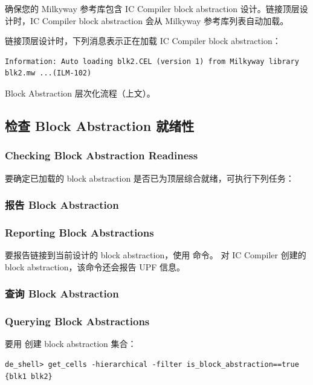 确保您的 Milkyway 参考库包含 IC Compiler block abstraction 设计。链接顶层设计时，IC Compiler block abstraction 会从 Milkyway 参考库列表自动加载。

链接顶层设计时，下列消息表示正在加载 IC Compiler block abstraction：
\begin{lstlisting}
Information: Auto loading blk2.CEL (version 1) from Milkyway library
blk2.mw ...(ILM-102)
\end{lstlisting}

\begin{seeAlsoBox}
Block Abstraction 层次化流程（上文）。
\end{seeAlsoBox}

\subsection{检查 Block Abstraction 就绪性}
\subsubsection*{Checking Block Abstraction Readiness}

要确定已加载的 block abstraction 是否已为顶层综合就绪，可执行下列任务：

\subsubsection{报告 Block Abstraction}
\subsubsection*{Reporting Block Abstractions}

要报告链接到当前设计的 block abstraction，使用  命令。
对 IC Compiler 创建的 block abstraction，该命令还会报告 UPF 信息。

\subsubsection{查询 Block Abstraction}
\subsubsection*{Querying Block Abstractions}

要用  创建 block abstraction 集合：
\begin{lstlisting}
de_shell> get_cells -hierarchical -filter is_block_abstraction==true
{blk1 blk2}
\end{lstlisting}

